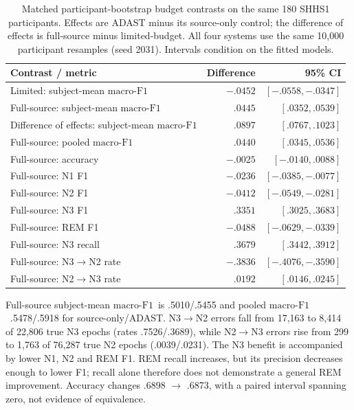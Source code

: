 \documentclass[10pt,a4paper]{article}
\newcommand{\mf}{\ensuremath{\mathrm{macro\text{-}F1}}}
\begin{document}
\begin{table}[H]
\centering\small
\renewcommand{\arraystretch}{1.0}
\caption{Matched participant-bootstrap budget contrasts on the same 180 SHHS1
participants. Effects are ADAST minus its source-only control; the difference of
effects is full-source minus limited-budget. All four systems use the same
10,000 participant resamples (seed 2031). Intervals condition on the fitted models.}
\label{tab:sup_adast_fullsource_contrasts}
\begin{tabular}{lrr}
\toprule
Contrast / metric & Difference & 95\% CI \\
\midrule
Limited: subject-mean \mf & $-.0452$ & $[-.0558,-.0347]$ \\
Full-source: subject-mean \mf & $.0445$ & $[.0352,.0539]$ \\
Difference of effects: subject-mean \mf & $.0897$ & $[.0767,.1023]$ \\
Full-source: pooled \mf & $.0440$ & $[.0345,.0536]$ \\
Full-source: accuracy & $-.0025$ & $[-.0140,.0088]$ \\
Full-source: N1 F1 & $-.0236$ & $[-.0385,-.0077]$ \\
Full-source: N2 F1 & $-.0412$ & $[-.0549,-.0281]$ \\
Full-source: N3 F1 & $.3351$ & $[.3025,.3683]$ \\
Full-source: REM F1 & $-.0488$ & $[-.0629,-.0339]$ \\
Full-source: N3 recall & $.3679$ & $[.3442,.3912]$ \\
Full-source: N3$\rightarrow$N2 rate & $-.3836$ & $[-.4076,-.3590]$ \\
Full-source: N2$\rightarrow$N3 rate & $.0192$ & $[.0146,.0245]$ \\
\bottomrule
\end{tabular}
\end{table}

Full-source subject-mean \mf\ is .5010/.5455 and pooled \mf\ .5478/.5918
for source-only/ADAST. N3$\rightarrow$N2 errors fall from 17,163 to 8,414 of
22,806 true N3 epochs (rates .7526/.3689), while N2$\rightarrow$N3 errors rise
from 299 to 1,763 of 76,287 true N2 epochs (.0039/.0231). The N3 benefit is
accompanied by lower N1, N2 and REM F1. REM recall increases, but its precision
decreases enough to lower F1; recall alone therefore does not demonstrate a
general REM improvement. Accuracy changes .6898 $\rightarrow$ .6873, with a
paired interval spanning zero, not evidence of equivalence.
\end{document}
